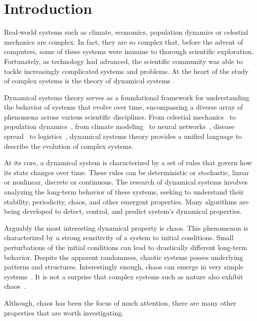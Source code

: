 \chapter{Introduction}
\label{sec:Introduction}

Real-world systems such as climate, economics, population dynamics or celestial mechanics are complex.
In fact, they are so complex that, before the advent of computers, some of these systems were immune to thorough scientific exploration.
Fortunately, as technology had advanced, the scientific community was able to tackle increasingly complicated systems and problems.
At the heart of the study of complex systems is the theory of dynamical systems \cite{Devaney20211026, Hirsch2013, Strogatz201854}.
\par
Dynamical systems theory serves as a foundational framework for understanding the behavior of systems that evolve over time, encompassing a diverse array of phenomena across various scientific disciplines.
From celestial mechanics~\cite{Holmes1990} to population dynamics~\cite{Hastings1993,Hadeler2001}, from climate modeling~\cite{Ghil2023} to neural networks~\cite{Cessac2009, Vogt2020, Li2019}, disease spread~\cite{Ritelli20210930} to logistics~\cite{Kumara2003}, dynamical systems theory provides a unified language to describe the evolution of complex systems.
\par
At its core, a dynamical system is characterized by a set of rules that govern how its state changes over time.
These rules can be deterministic or stochastic, linear or nonlinear, discrete or continuous.
The research of dynamical systems involves analyzing the long-term behavior of these systems, seeking to understand their stability, periodicity, chaos, and other emergent properties.
Many algorithms are being developed to detect, control, and predict system's dynamical properties.
\par
Arguably the most interesting dynamical property is chaos.
This phenomenon is characterized by a strong sensitivity of a system to initial conditions.
Small perturbations of the initial conditions can lead to drastically different long-term behavior.
Despite the apparent randomness, chaotic systems posses underlying patterns and structures.
Interestingly enough, chaos can emerge in very simple systems~\cite{Lorenz2004,May19760610}.
It is not a surprise that complex systems such as nature also exhibit chaos~\cite{Toker2020}.
\par
Although, chaos has been the focus of much attention, there are many other properties that are worth investigating.
